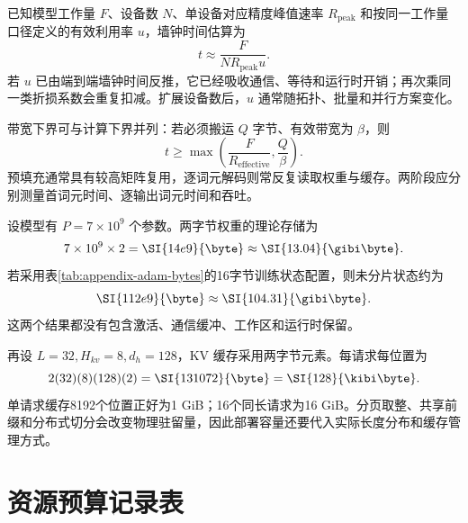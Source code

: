 \documentclass[../textbook.tex]{subfiles}
\begin{document}
已知模型工作量 $F$、设备数 $N$、单设备对应精度峰值速率 $R_{\mathrm{peak}}$ 和按同一工作量口径定义的有效利用率 $u$，墙钟时间估算为
\begin{equation}
 t\approx\frac{F}{NR_{\mathrm{peak}}u}.
 \label{eq:appendix-runtime}
\end{equation}
若 $u$ 已由端到端墙钟时间反推，它已经吸收通信、等待和运行时开销；再次乘同一类折损系数会重复扣减。扩展设备数后，$u$ 通常随拓扑、批量和并行方案变化。

带宽下界可与计算下界并列：若必须搬运 $Q$ 字节、有效带宽为 $\beta$，则
\begin{equation}
 t\geq\max\left(\frac{F}{R_{\mathrm{effective}}},\frac{Q}{\beta}\right).
\end{equation}
预填充通常具有较高矩阵复用，逐词元解码则常反复读取权重与缓存。两阶段应分别测量首词元时间、逐输出词元时间和吞吐。

\begin{example}

设模型有 $P=7\times10^9$ 个参数。两字节权重的理论存储为
\begin{equation*}
 7\times10^9\times2=\SI{14e9}{\byte}\approx\SI{13.04}{\gibi\byte}.
\end{equation*}
若采用表\ref{tab:appendix-adam-bytes}的16字节训练状态配置，则未分片状态约为
\begin{equation*}
 \SI{112e9}{\byte}\approx\SI{104.31}{\gibi\byte}.
\end{equation*}
这两个结果都没有包含激活、通信缓冲、工作区和运行时保留。

再设 $L=32,H_{kv}=8,d_h=128$，KV 缓存采用两字节元素。每请求每位置为
\begin{equation*}
 2(32)(8)(128)(2)=\SI{131072}{\byte}=\SI{128}{\kibi\byte}.
\end{equation*}
单请求缓存8192个位置正好为1 GiB；16个同长请求为16 GiB。分页取整、共享前缀和分布式切分会改变物理驻留量，因此部署容量还要代入实际长度分布和缓存管理方式。

\end{example}

\section{资源预算记录表}
\end{document}
